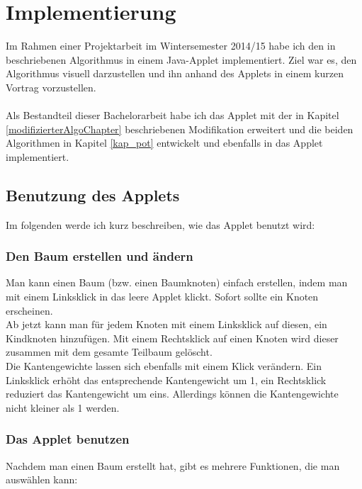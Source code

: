 \section{Implementierung}\label{kap_implementierung}

Im Rahmen einer Projektarbeit im Wintersemester 2014/15 habe ich den in \cite{cima_paper} beschriebenen Algorithmus in einem Java-Applet implementiert. Ziel war es, den Algorithmus visuell darzustellen und ihn anhand des Applets in einem kurzen Vortrag vorzustellen.
\\
\\
Als Bestandteil dieser Bachelorarbeit habe ich das Applet mit der in Kapitel \ref{modifizierterAlgoChapter} beschriebenen Modifikation erweitert und die beiden Algorithmen in Kapitel \ref{kap_pot} entwickelt und ebenfalls in das Applet implementiert.


\subsection{Benutzung des Applets}

Im folgenden werde ich kurz beschreiben, wie das Applet benutzt wird:

\subsubsection*{Den Baum erstellen und ändern}

Man kann einen Baum (bzw. einen Baumknoten) einfach erstellen, indem man mit einem Linksklick in das leere Applet klickt. Sofort sollte ein Knoten erscheinen.\\
Ab jetzt kann man für jedem Knoten mit einem Linksklick auf diesen, ein Kindknoten hinzufügen. Mit einem Rechtsklick auf einen Knoten wird dieser zusammen mit dem gesamte Teilbaum gelöscht.\\
Die Kantengewichte lassen sich ebenfalls mit einem Klick verändern. Ein Linksklick erhöht das entsprechende Kantengewicht um 1, ein Rechtsklick reduziert das Kantengewicht um eins. Allerdings können die Kantengewichte nicht kleiner als 1 werden.


\subsubsection*{Das Applet benutzen}

Nachdem man einen Baum erstellt hat, gibt es mehrere Funktionen, die man auswählen kann:\\


